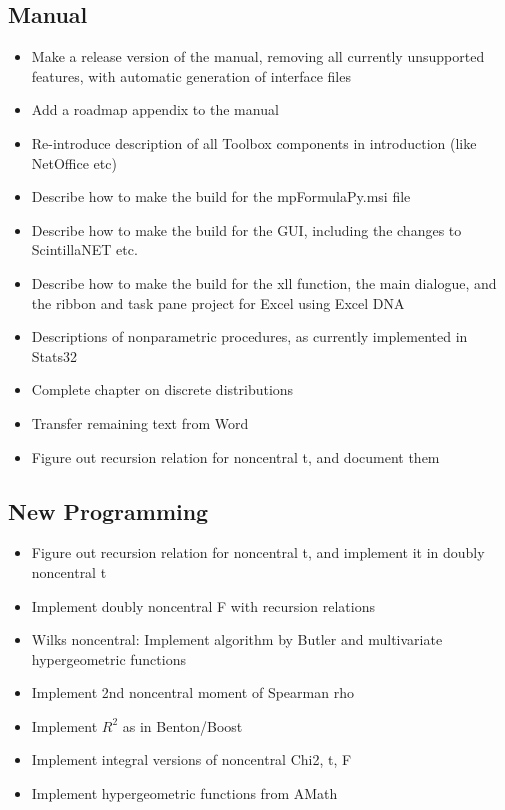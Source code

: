 	\subsection{Manual}
	\begin{itemize}
		\item Make a release version of the manual, removing all currently unsupported features, with automatic generation of interface files
		\item Add a roadmap appendix to the manual
		\item Re-introduce description of all Toolbox components in introduction (like NetOffice etc)
		\item Describe how to make the build for the mpFormulaPy.msi file
		\item Describe how to make the build for the GUI, including the changes to ScintillaNET etc.
		\item Describe how to make the build for the xll function, the main dialogue, and the ribbon and task pane project for Excel using Excel DNA
		\item Descriptions of nonparametric procedures, as currently implemented in Stats32
		\item Complete chapter on discrete distributions
		\item Transfer remaining text from Word
		\item Figure out recursion relation for noncentral t, and document them
	\end{itemize}
	
	
	\subsection{New Programming}
	\begin{itemize}
		\item Figure out recursion relation for noncentral t, and implement it in doubly noncentral t
		\item Implement doubly noncentral F with recursion relations
		\item Wilks noncentral: Implement algorithm by Butler and multivariate hypergeometric functions
		\item Implement 2nd noncentral moment of Spearman rho
		\item Implement $R^2$ as in Benton/Boost
		\item Implement integral versions of noncentral Chi2, t, F
		\item Implement hypergeometric functions from AMath
	\end{itemize}
	



